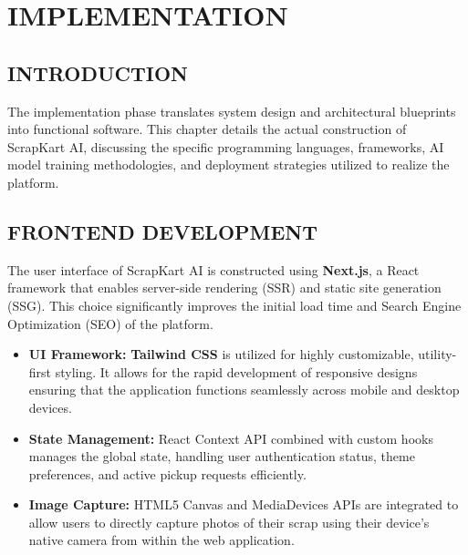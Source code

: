 \chapter{IMPLEMENTATION}

\section{INTRODUCTION}
The implementation phase translates system design and architectural blueprints into functional software. This chapter details the actual construction of ScrapKart AI, discussing the specific programming languages, frameworks, AI model training methodologies, and deployment strategies utilized to realize the platform.

\section{FRONTEND DEVELOPMENT}
The user interface of ScrapKart AI is constructed using \textbf{Next.js}, a React framework that enables server-side rendering (SSR) and static site generation (SSG). This choice significantly improves the initial load time and Search Engine Optimization (SEO) of the platform.
\begin{itemize}
    \item \textbf{UI Framework:} \textbf{Tailwind CSS} is utilized for highly customizable, utility-first styling. It allows for the rapid development of responsive designs ensuring that the application functions seamlessly across mobile and desktop devices.
    \item \textbf{State Management:} React Context API combined with custom hooks manages the global state, handling user authentication status, theme preferences, and active pickup requests efficiently.
    \item \textbf{Image Capture:} HTML5 Canvas and MediaDevices APIs are integrated to allow users to directly capture photos of their scrap using their device's native camera from within the web application.
\end{itemize}

